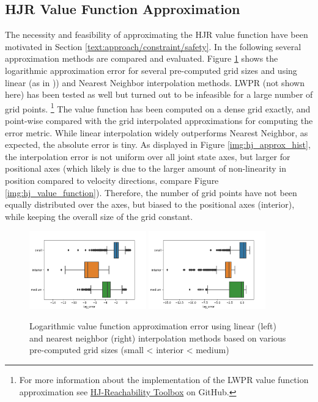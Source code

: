 \subsection{HJR Value Function Approximation}
The necessity and feasibility of approximating the \ac{HJR} value function have been motivated in Section \ref{text:approach/constraint/safety}. In the following several approximation methods are compared and evaluated.
\newline 
Figure \ref{img:hj_approx_bar} shows the logarithmic approximation error for several pre-computed grid sizes and using linear (as in \cite{Leung2020})) and Nearest Neighbor interpolation methods. LWPR (not shown here) has been tested as well but turned out to be infeasible for a large number of grid points. \footnote{For more information about the implementation of the LWPR value function approximation see \href{https://github.com/simon-schaefer/HJReachibility}{HJ-Reachability Toolbox} on GitHub.} The value function has been computed on a dense grid exactly, and point-wise compared with the grid interpolated approximations for computing the error metric. While linear interpolation widely outperforms Nearest Neighbor, as expected, the absolute error is tiny. As displayed in Figure \ref{img:hj_approx_hist}, the interpolation error is not uniform over all joint state axes, but larger for positional axes (which likely is due to the larger amount of non-linearity in position compared to velocity directions, compare Figure \ref{img:hj_value_function}). Therefore, the number of grid points have not been equally distributed over the axes, but biased to the positional axes (interior), while keeping the overall size of the grid constant.

\begin{figure}[!ht]
\begin{center}
\includegraphics[width=0.45\textwidth]{images/hj_bar_linear.png}
\includegraphics[width=0.45\textwidth]{images/hj_bar_nearest.png}
\caption{Logarithmic value function approximation error using linear (left) and nearest neighbor (right) interpolation methods based on various pre-computed grid sizes (small < interior < medium)}
\label{img:hj_approx_bar}
\end{center}
\end{figure}

